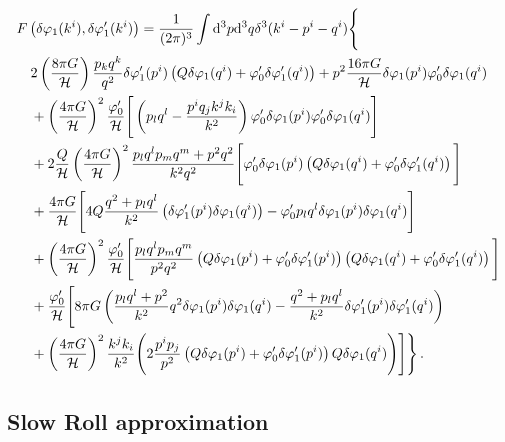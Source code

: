 %
\begin{align}
 \label{eq:Fdvk1-fourier-num}
&F\left(\dvp1(\kvi),\dvp1'(\kvi)\right)
= \frac{1}{(2\pi)^3}\int \d^3p \d^3q\delta^3(\kvi-\pvi-\qvi) 
\Bigg\{ \nonumber \\
% 
&\quad 2\left(\frac{8\pi G}{\H}\right)\frac{p_kq^k}{q^2}
\delta\vp_{1}'(\pvi)\left(Q\dvp1(\qvi)+\vp_{0}'\dvp1'(\qvi)\right)
+p^2\frac{16\pi G}{\H}\dvp1(\pvi)\vp_{0}'\dvp1(\qvi) \nonumber \\
% 
&\quad 
+\left(\frac{4\pi G}{\H}\right)^2
\frac{\vp_{0}'}{\H}\Bigg[
\left(p_lq^l-\frac{p^iq_jk^jk_i}{k^2}\right) 
\vp_{0}'\delta\vp_{1}(\pvi)\vp_{0}'\delta\vp_{1}(\qvi)
\Bigg]\nonumber\\
% 
&\quad +2\frac{Q}{\H}\left(\frac{4\pi G}{\H}\right)^2 
\frac{p_lq^lp_mq^m+p^2q^2}{k^2q^2}
\Bigg[\vp_{0}'\delta\vp_{1}(\pvi)
\left(Q\dvp1(\qvi)+\vp_{0}'\dvp1'(\qvi)\right)
\Bigg]
%
\nonumber\\
%
&\quad +\frac{4\pi G}{\H}
\Bigg[
4Q\frac{q^2+p_lq^l}{k^2}\left(
\dvp1'(\pvi)\dvp1(\qvi)\right)
-\vp_{0}'p_lq^l \delta\vp_{1}(\pvi)\delta\vp_{1}(\qvi)
\Bigg]
\nonumber\\
%
&\quad +\left(\frac{4\pi G}{\H}\right)^2
\frac{\vp_{0}'}{\H}\Bigg[
\frac{p_lq^lp_mq^m}{p^2q^2}
\left( Q\dvp1(\pvi)+\vp_{0}'\dvp1'(\pvi)\right)
\left(Q\dvp1(\qvi)+\vp_{0}'\dvp1'(\qvi)\right)
\Bigg]\nonumber\\
%
&\quad +\frac{\vp_{0}'}{\H}
\Bigg[
8\pi G\left(\frac{p_lq^l+p^2}{k^2}q^2\dvp1(\pvi)\dvp1(\qvi)
-\frac{q^2+p_lq^l}{k^2}\dvp1'(\pvi)\dvp1'(\qvi)
\right)
\nonumber\\
%
%
&\quad +\left(\frac{4\pi G}{\H}\right)^2
\frac{k^jk_i}{k^2}\Bigg(
2\frac{p^ip_j}{p^2}
\left(Q\dvp1(\pvi)+\vp_{0}'\dvp1'(\pvi)\right)
Q\dvp1(\qvi)
\Bigg)\Bigg]
\Bigg\}\,.
\end{align}


\subsection{Slow Roll approximation}
\label{sec:slowroll}


